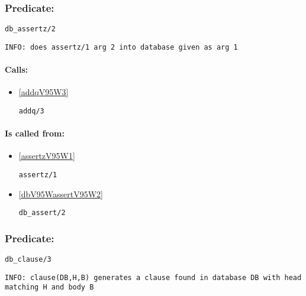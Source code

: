 \subsubsection{Predicate:} \label{dbV95WassertzV95W2}

\begin{verbatim}
db_assertz/2
\end{verbatim}

{\small \begin{verbatim}
INFO: does assertz/1 arg 2 into database given as arg 1

\end{verbatim}}
\paragraph{Calls:} 
\begin{itemize}
\item \ref{addqV95W3} 
\begin{verbatim}
addq/3
\end{verbatim}

\end{itemize}
\paragraph{Is called from:} 
\begin{itemize}
\item \ref{assertzV95W1} 
\begin{verbatim}
assertz/1
\end{verbatim}

\item \ref{dbV95WassertV95W2} 
\begin{verbatim}
db_assert/2
\end{verbatim}

\end{itemize}

\subsubsection{Predicate:} \label{dbV95WclauseV95W3}

\begin{verbatim}
db_clause/3
\end{verbatim}

{\small \begin{verbatim}
INFO: clause(DB,H,B) generates a clause found in database DB with head matching H and body B

\end{verbatim}}
